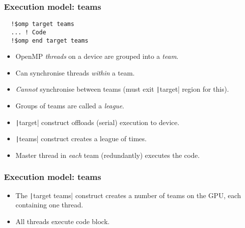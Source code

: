 \documentclass[aspectratio=169]{beamer}
\begin{document}
  \begin{frame}[fragile]
  \frametitle{Execution model: teams}
  
  \begin{verbatim}
  !$omp target teams 
  ... ! Code
  !$omp end target teams
  \end{verbatim}
  
  \begin{itemize}
    \item OpenMP \emph{threads} on a device are grouped into a \emph{team}.
    \item Can synchronise threads \emph{within} a team.
    \item \emph{Cannot} synchronise between teams (must exit \texttt|target| region for this).
    \item Groups of teams are called a \emph{league}.
    \item \texttt|target| construct offloads (serial) execution to device.
    \item \texttt|teams| construct creates a league of times.
    \item Master thread in \emph{each} team (redundantly) executes the code.
  \end{itemize}
  
  \end{frame}
  
  \begin{frame}
  \frametitle{Execution model: teams}
  \begin{itemize}
    \item The \texttt|target teams| construct creates a number of teams on the GPU, each containing one thread.
    \item All threads execute code block.
  \end{itemize}
  
  \begin{center}
  \end{center}
  \end{frame}
  
\end{document}
